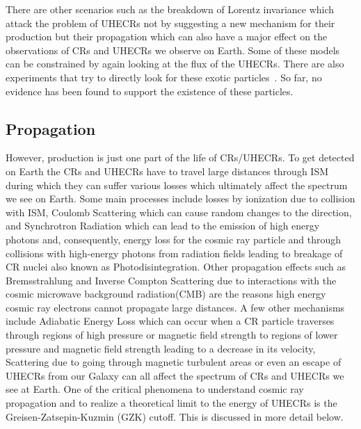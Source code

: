 There are other scenarios such as the breakdown of Lorentz invariance which attack the problem of UHECRs not by suggesting a new mechanism for their production but their propagation which can also have a major effect on the observations of CRs and UHECRs we observe on Earth. Some of these models can be constrained by again looking at the flux of the UHECRs. There are also experiments that try to directly look for these exotic particles~\cite{}. So far, no evidence has been found to support the existence of these particles. 

\subsection{Propagation}
\label{subsec:crprop}
However, production is just one part of the life of CRs/UHECRs. To get detected on Earth the CRs and UHECRs have to travel large distances through ISM during which they can suffer various losses which ultimately affect the spectrum we see on Earth. Some main processes include losses by ionization due to collision with ISM, Coulomb Scattering which can cause random changes to the direction, and Synchrotron Radiation which can lead to the emission of high energy photons and, consequently, energy loss for the cosmic ray particle and through collisions with high-energy photons from radiation fields leading to breakage of CR nuclei also known as Photodisintegration. Other propagation effects such as Bremsstrahlung and Inverse Compton Scattering due to interactions with the cosmic microwave background radiation(CMB)  are the reasons high energy cosmic ray electrons cannot propagate large distances. A few other mechanisms include Adiabatic Energy Loss which can occur when a CR particle traverses through regions of high pressure or magnetic field strength to regions of lower pressure and magnetic field strength leading to a decrease in its velocity, Scattering due to going through magnetic turbulent areas or even an escape of UHECRs from our Galaxy can all affect the spectrum of CRs and UHECRs we see at Earth. One of the critical phenomena to understand cosmic ray propagation and to realize a theoretical limit to the energy of UHECRs is the Greisen-Zatsepin-Kuzmin (GZK) cutoff. This is discussed in more detail below.

